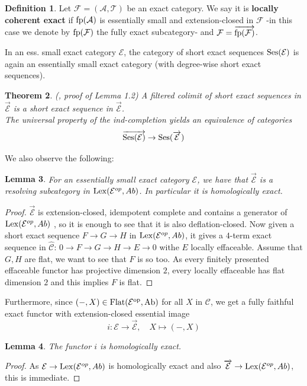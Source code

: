 \documentclass[11pt,a4paper]{amsart}
\theoremstyle{plain}
\newtheorem{thm}{Theorem}[section]
\newtheorem{lem}[thm]{Lemma}
\theoremstyle{definition}
\newtheorem{dfn}[thm]{Definition}
\newcommand{\mcA}{\mathcal{A}}
\newcommand{\mcC}{\mathcal{C}}
\newcommand{\mcE}{\mathcal{E}}
\newcommand{\mcF}{\mathcal{F}}
\newcommand{\mcT}{\mathcal{T}}
\begin{document}
\begin{dfn}
Let $\mcF=(\mcA, \mcT)$ be an exact category. We say it is \textbf{locally coherent exact} if $\rm{fp}(\mcA)$ is essentially small and extension-closed in $\mcF$ -in this case we denote by ${\rm fp} (\mcF)$ the fully exact subcategory- and $\mcF=\overrightarrow{{\rm fp} (\mcF)}$.
\end{dfn}


In an ess. small exact category $\mcE$, the category of short exact sequences ${\rm Ses}(\mcE)$ is again an essentially small exact category (with degree-wise short exact sequences). 
\begin{thm} \label{PosThm} (\cite{P-locCoh}, proof of Lemma 1.2) 
A filtered colimit of short exact sequences in $\overrightarrow{\mcE}$ is a short exact sequence in $\overrightarrow{\mcE}$.\\
The universal property of the ind-completion yields an equivalence of categories
\[
\overrightarrow{{\rm Ses} (\mcE)} \to {\rm Ses} (\overrightarrow{\mcE})
\]    
\end{thm}

We also observe the following: 
\begin{lem}
For an essentially small exact category $\mcE$, we have that $\overrightarrow{\mcE}$ is a resolving subcategory in ${\rm Lex}(\mcE^{op},Ab)$. In particular it is homologically exact. 
\end{lem}

\begin{proof}
$\overrightarrow{\mcE}$ is extension-closed, idempotent complete and contains a generator of ${\rm Lex}(\mcE^{op},Ab)$ , so it is enough to see that it is also deflation-closed. Now given a short exact sequence $F \to G \to H$ in ${\rm Lex}(\mcE^{op},Ab)$, it gives a $4$-term exact sequence in $\hat{\mcC}$: $0\to F\to G \to H \to E\to 0$ withe $E$ locally effaceable. Assume that $G,H$ are flat, we want to see that $F$ is so too. As every finitely presented effaceable functor has projective dimension $2$, every locally effaceable has flat dimension $2$ and this implies $F$ is flat.
\end{proof}


Furthermore, since $(-,X)\in \rm{Flat} (\mcE^{op},Ab)$ for all $X$ in $\mcC$, we get a fully faithful exact functor with extension-closed essential image 
\[
i\colon \mcE \to \overrightarrow{\mcE}, \quad X \mapsto (-,X)
\]

\begin{lem}
The functor $i$ is homologically exact. 
\end{lem}
\begin{proof}
As $\mcE \to {\rm Lex}(\mcE^{op},Ab)$ is homologically exact and also $\overrightarrow{\mcE}\to {\rm Lex}(\mcE^{op},Ab)$, this is immediate. 
\end{proof}
\end{document}
